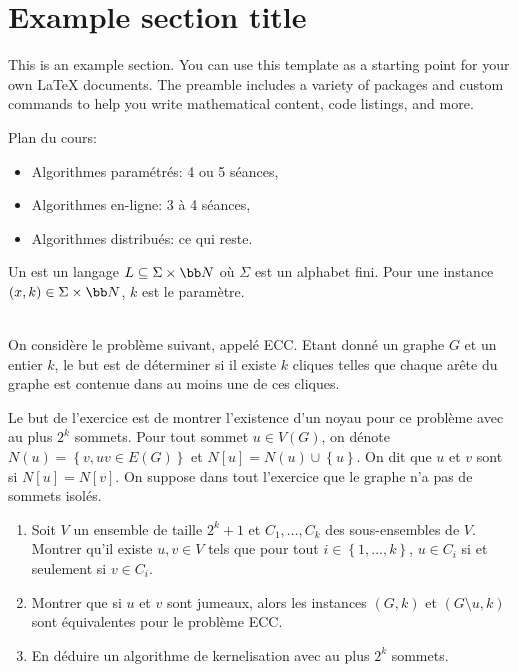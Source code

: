 \section{Example section title}

This is an example section. You can use this template as a starting point for your own LaTeX documents. The preamble includes a variety of packages and custom commands to help you write mathematical content, code listings, and more.

Plan du cours: 
\begin{itemize}
    \item Algorithmes paramétrés: 4 ou 5 séances,
    \item Algorithmes en-ligne: 3 à 4 séances,
    \item Algorithmes distribués: ce qui reste.
\end{itemize}

\begin{definition}
    Un  est un langage \(L \subseteq \Sigma \times \bb N\) où \(\Sigma\) est un alphabet fini. 
    Pour une instance \((x, k) \in \Sigma \times \bb N\), \(k\) est le paramètre.
\end{definition}





\begin{td-exo}\,\\
    On considère le problème suivant, appelé ECC.
    Etant donné un graphe \(G\) et un entier \(k\), le but est de déterminer si il existe \(k\) cliques telles que chaque arête du graphe est contenue dans au moins une de ces cliques.

    Le but de l'exercice est de montrer l'existence d'un noyau pour ce problème avec au plus \(2^k\) sommets.
    Pour tout sommet \(u\in V(G)\), on dénote \(N(u) = \left\{ v, uv \in E(G) \right\}\) et \(N[u] = N(u) \cup \left\{ u \right\}\).
    On dit que \(u\) et \(v\) sont  si \(N[u] = N[v]\).
    On suppose dans tout l'exercice que le graphe n'a pas de sommets isolés.

    \begin{enumerate}
        \item Soit \(V\) un ensemble de taille \(2^k + 1\) et \(C_1,\ldots,C_k\) des sous-ensembles de \(V\).
        Montrer qu'il existe \(u, v \in V\) tels que pour tout \(i \in \left\{ 1,\ldots,k \right\}\), \(u \in C_i\) si et seulement si \(v \in C_i\).

        \item Montrer que si \(u\) et \(v\) sont jumeaux, alors les instances \((G, k)\) et \((G \setminus u, k)\) sont équivalentes pour le problème ECC.

        \item En déduire un algorithme de kernelisation avec au plus \(2^k\) sommets.
    \end{enumerate}

\end{td-exo}



